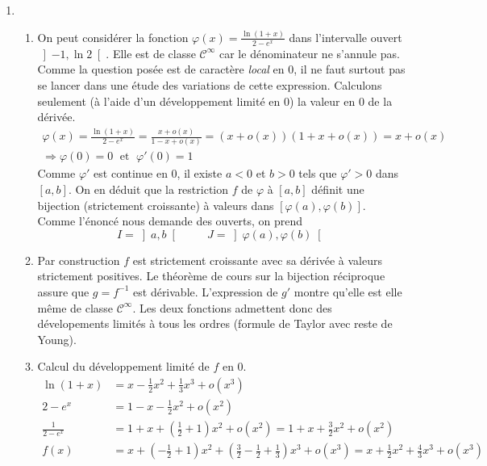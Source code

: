 \begin{enumerate}
  \item
\begin{enumerate}
  \item On peut considérer la fonction $\varphi(x)=\frac{\ln(1+x)}{2-e^x}$ dans l'intervalle ouvert $\left] -1, \ln 2 \right[$. Elle est de classe $\mathcal{C}^{\infty}$ car le dénominateur ne s'annule pas. Comme la question posée est de caractère \emph{local} en $0$, il ne faut surtout pas se lancer dans une étude des variations de cette expression.\newline
Calculons seulement (à l'aide d'un développement limité en $0$) la valeur en $0$ de la dérivée.
\begin{multline*}
 \varphi(x)= \frac{\ln(1+x)}{2-e^x} = \frac{x+o(x)}{1-x+o(x)} =(x+o(x))(1+x+o(x))=x+o(x)\\
 \Rightarrow \varphi(0)=0\;\text{ et }\; \varphi'(0) = 1
\end{multline*}
Comme $\varphi'$ est continue en $0$, il existe $a<0$ et $b>0$ tels que $\varphi'>0$ dans $[a,b]$. On en déduit que la restriction $f$ de $\varphi$ à $[a,b]$ définit une bijection (strictement croissante) à valeurs dans $[\varphi(a),\varphi(b)]$. Comme l'énoncé nous demande des ouverts, on prend
\begin{displaymath}
  I = \left] a,b\right[ \hspace{1cm}   J = \left] \varphi(a) , \varphi(b)\right[ 
\end{displaymath}

  \item Par construction $f$ est strictement croissante avec sa dérivée à valeurs strictement positives. Le théorème de cours sur la bijection réciproque assure que $g=f^{-1}$ est dérivable. L'expression de $g'$ montre qu'elle est elle même de classe $\mathcal{C}^{\infty}$. Les deux fonctions admettent donc des dévelopements limités à tous les ordres (formule de Taylor avec reste de Young).
  
  \item Calcul du développement limité de $f$ en $0$.
\begin{align*}
\ln(1+x) &= x -\frac{1}{2}x^2 + \frac{1}{3}x^3 + o(x^3)\\
2-e^x &= 1-x - \frac{1}{2}x^2 + o(x^2) \\
\frac{1}{2-e^x} &= 1 + x + (\frac{1}{2}+1)x^2 + o(x^2) = 1 + x + \frac{3}{2}x^2 + o(x^2) \\
f(x) &= x+ (-\frac{1}{2}+1)x^2 +(\frac{3}{2}-\frac{1}{2}+\frac{1}{3})x^3 + o(x^3)= x + \frac{1}{2}x^2 + \frac{4}{3}x^3 + o(x^3) 
\end{align*}


\end{enumerate}
\end{enumerate}
